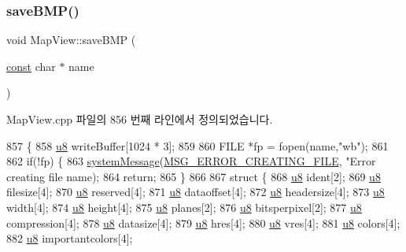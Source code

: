 \subsubsection{\texorpdfstring{save\+B\+M\+P()}{saveBMP()}}
{\footnotesize\ttfamily void Map\+View\+::save\+B\+MP (\begin{DoxyParamCaption}\item[{\mbox{\hyperlink{getopt1_8c_a2c212835823e3c54a8ab6d95c652660e}{const}} char $\ast$}]{name }\end{DoxyParamCaption})}



Map\+View.\+cpp 파일의 856 번째 라인에서 정의되었습니다.


\begin{DoxyCode}
857 \{
858   \mbox{\hyperlink{_system_8h_aed742c436da53c1080638ce6ef7d13de}{u8}} writeBuffer[1024 * 3];
859   
860   FILE *fp = fopen(name,\textcolor{stringliteral}{"wb"});
861 
862   \textcolor{keywordflow}{if}(!fp) \{
863     \mbox{\hyperlink{system_8cpp_a747a9cb8e015a3d45cca636b5bd0fc69}{systemMessage}}(\mbox{\hyperlink{_n_l_s_8h_a165f1f2539e202f0a24e6e9583c63475}{MSG\_ERROR\_CREATING\_FILE}}, \textcolor{stringliteral}{"Error creating file %
      name);
864     \textcolor{keywordflow}{return};
865   \}
866 
867   \textcolor{keyword}{struct }\{
868     \mbox{\hyperlink{_system_8h_aed742c436da53c1080638ce6ef7d13de}{u8}} ident[2];
869     \mbox{\hyperlink{_system_8h_aed742c436da53c1080638ce6ef7d13de}{u8}} filesize[4];
870     \mbox{\hyperlink{_system_8h_aed742c436da53c1080638ce6ef7d13de}{u8}} reserved[4];
871     \mbox{\hyperlink{_system_8h_aed742c436da53c1080638ce6ef7d13de}{u8}} dataoffset[4];
872     \mbox{\hyperlink{_system_8h_aed742c436da53c1080638ce6ef7d13de}{u8}} headersize[4];
873     \mbox{\hyperlink{_system_8h_aed742c436da53c1080638ce6ef7d13de}{u8}} width[4];
874     \mbox{\hyperlink{_system_8h_aed742c436da53c1080638ce6ef7d13de}{u8}} height[4];
875     \mbox{\hyperlink{_system_8h_aed742c436da53c1080638ce6ef7d13de}{u8}} planes[2];
876     \mbox{\hyperlink{_system_8h_aed742c436da53c1080638ce6ef7d13de}{u8}} bitsperpixel[2];
877     \mbox{\hyperlink{_system_8h_aed742c436da53c1080638ce6ef7d13de}{u8}} compression[4];
878     \mbox{\hyperlink{_system_8h_aed742c436da53c1080638ce6ef7d13de}{u8}} datasize[4];
879     \mbox{\hyperlink{_system_8h_aed742c436da53c1080638ce6ef7d13de}{u8}} hres[4];
880     \mbox{\hyperlink{_system_8h_aed742c436da53c1080638ce6ef7d13de}{u8}} vres[4];
881     \mbox{\hyperlink{_system_8h_aed742c436da53c1080638ce6ef7d13de}{u8}} colors[4];
882     \mbox{\hyperlink{_system_8h_aed742c436da53c1080638ce6ef7d13de}{u8}} importantcolors[4];
}
\end{DoxyCode}

